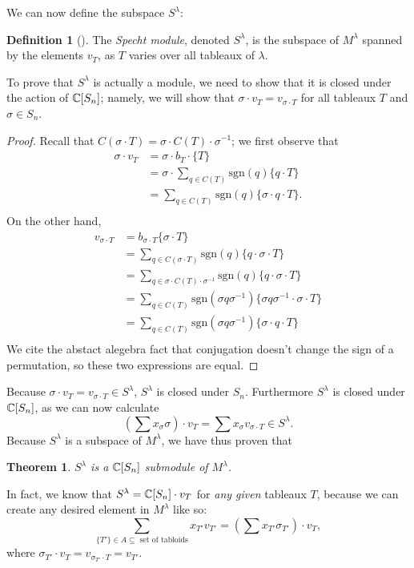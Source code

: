 \documentclass[12pt,twoside]{reedthesis}
\theoremstyle{plain}   %
\newtheorem{thm}{Theorem}[section] %
\theoremstyle{definition}
\newtheorem{defn}{Definition}[section]
\theoremstyle{remark}
\numberwithin{equation}{section}
\def\sgn{\mathrm{sgn}}
\begin{document}
  We can now define the subspace $S^\lambda$:
  \begin{defn}[{\cite[Pg. 87]{fulton}}]
    The \emph{Specht module}, denoted \emph{$S^\lambda$}, is the subspace of $M^\lambda$ spanned by the elements $v_T$, as $T$ varies over all tableaux of
    $\lambda$.
  \end{defn}
  To prove that $S^\lambda$ is actually a module, we need to show that it is closed under the action of $\mathbb{C}[S_n]$; namely,
  we will show that $\sigma \cdot v_T = v_{\sigma \cdot T}$ for all tableaux $T$ and $\sigma \in S_n$.
  \begin{proof}
    Recall that $C(\sigma \cdot T) = \sigma \cdot C(T) \cdot \sigma^{-1}$; we first observe that
    \begin{align*}
      \sigma \cdot v_{T} &= \sigma \cdot b_T \cdot \{ T\} \\
                         &= \sigma \cdot \sum_{ q \in C(T)} \sgn(q) \{q \cdot T\} \\
                         &= \sum_{ q \in C(T)} \sgn(q) \{\sigma \cdot q \cdot T\}. \\
    \end{align*}
    On the other hand,
    \begin{align*}
      v_{\sigma \cdot T} &= b_{\sigma \cdot T} \{ \sigma \cdot T\} \\
                         &= \sum_{q \in C(\sigma \cdot T)} \sgn(q) \{q \cdot \sigma \cdot T\}\\
                         &= \sum_{q \in \sigma \cdot C(T) \cdot \sigma^{-1}} \sgn(q) \{q \cdot \sigma \cdot T\}\\
                         &= \sum_{q \in C(T)} \sgn(\sigma q \sigma^{-1}) \{\sigma q \sigma^{-1} \cdot \sigma \cdot T\}\\
                         &= \sum_{q \in C(T)} \sgn(\sigma q \sigma^{-1}) \{\sigma \cdot q \cdot T\}\\      
    \end{align*}
    We cite the abstact alegebra fact that conjugation doesn't change the sign of a permutation, so these two expressions are equal.
  \end{proof}

  Because $\sigma \cdot v_T = v_{\sigma \cdot T} \in S^\lambda$, $S^\lambda$ is closed under $S_n$. Furthermore $S^\lambda$ is closed under $\mathbb{C} [S_n]$, as we can
  now calculate
  \[(\sum x_\sigma \sigma) \cdot v_T = \sum x_\sigma v_{\sigma \cdot T} \in S^\lambda.\]
  Because $S^\lambda$ is a subspace of $M^\lambda$, we have thus proven that
  \begin{thm}
    $S^\lambda$ is a $\mathbb{C}[S_n]$ submodule of $M^\lambda$.
  \end{thm}
  In fact, we know that $S^\lambda = \mathbb{C}[S_n] \cdot v_T$ for \emph{any given} tableaux $T$,
  because we can create any desired element in $M^\lambda$ like so:
  \[\sum_{\{T'\} \in A \subseteq \text{ set of tabloids}} x_{T'} v_{T'} = (\sum x_{T'} \sigma_{T'}) \cdot v_T,\]
  where $\sigma_{T'} \cdot v_T = v_{\sigma_{T'} \cdot T} = v_{T'}$.
\end{document}
